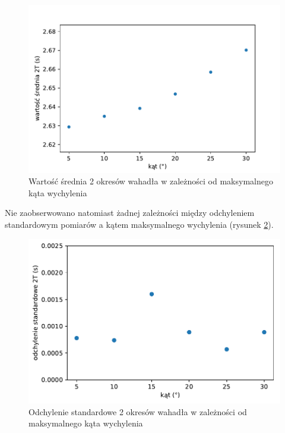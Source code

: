 \documentclass[a4paper]{article}
\begin{document}
\begin{figure}[h!]
\centering
	\includegraphics[scale=0.7]{wykres-1_0.pdf}
\caption{Wartość średnia 2 okresów wahadła w zależności od maksymalnego kąta wychylenia}
\label{fig:mean}
\end{figure}

Nie zaobserwowano natomiast żadnej zależności między odchyleniem standardowym pomiarów 
a kątem maksymalnego wychylenia (rysunek \ref{fig:std}).


\begin{figure}[h!]
\centering
	\includegraphics[scale=0.7]{wykres-2_1.pdf}
\caption{Odchylenie standardowe 2 okresów wahadła w zależności od maksymalnego kąta wychylenia}
\label{fig:std}
\end{figure}
\end{document}
